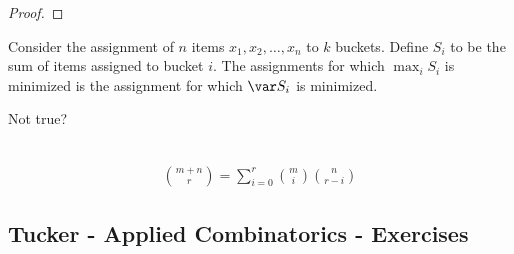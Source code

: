 \begin{proof}
\end{proof}

\begin{claim}
  Consider the assignment of $n$ items $x_1, x_2, \ldots, x_n$ to $k$ buckets. Define $S_i$ to be the sum of items assigned to bucket $i$. The assignments for which $\max_i S_i$ is minimized is the assignment for which $\var S_i$ is minimized.
\end{claim}

Not true?

\begin{theorem*}[Identities]~\\
  \begin{align*}
    {m + n \choose r} = \sum_{i=0}^r {m \choose i}{n \choose r - i}
  \end{align*}
\end{theorem*}

\subsection{Tucker - Applied Combinatorics - Exercises}

